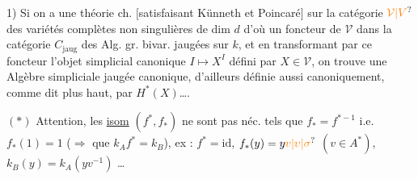  1) Si on a une théorie ch.  $[$satisfaisant Künneth et Poincaré$]$ sur la catégorie $\unsure{\mathcal V|V}$ des variétés complètes  non singulières de dim $d$ d'où un foncteur  de $\mathcal V$ dans la catégorie $C_{\mathrm{jaug}}$ des Alg. gr. bivar. jaugées sur $k$, et en transformant par ce foncteur l'objet simplicial canonique $I\longmapsto X^I$ défini par $X\in\mathcal V$, on trouve une Algèbre  simpliciale  jaugée canonique, d'ailleurs définie aussi canoniquement, comme dit plus haut, par   $H^*(X)$\ldots.

$(*)$ Attention, les \uline{isom} $(f^*,f_*)$ ne sont pas néc. tels que $f_*=f^{*-1}$ i.e. $f_*(1)=1$ ($\Rightarrow$  que $k_A f^*=k_B$), ex : $f^*=\mathrm{id}$, $f_*(y)=y\unsure{v|\upsilon|\sigma}$ $(v\in A^*)$, $k_B(y)=k_A(yv^{-1})$ \ldots

